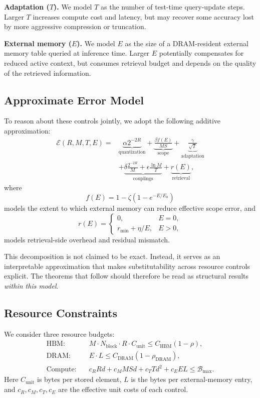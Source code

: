 \documentclass[11pt,a4paper]{article}
\theoremstyle{plain}
\theoremstyle{definition}
\begin{document}
\textbf{Adaptation ($T$).} We model $T$ as the number of test-time query-update steps. Larger $T$ increases compute cost and latency, but may recover some accuracy lost by more aggressive compression or truncation.

\textbf{External memory ($E$).} We model $E$ as the size of a DRAM-resident external memory table queried at inference time. Larger $E$ potentially compensates for reduced active context, but consumes retrieval budget and depends on the quality of the retrieved information.

\subsection{Approximate Error Model}
To reason about these controls jointly, we adopt the following additive approximation:
\begin{equation}
\begin{aligned}
\mathcal{E}(R,M,T,E) = &\underbrace{\alpha 2^{-2R}}_{\text{quantization}} + \underbrace{\frac{\beta f(E)}{MS}}_{\text{scope}} + \underbrace{\frac{\gamma}{\sqrt{T}}}_{\text{adaptation}} \\
&+ \underbrace{\delta\frac{2^{-2R}}{M} + \epsilon\frac{\ln M}{T}}_{\text{couplings}} + \underbrace{r(E)}_{\text{retrieval}},
\end{aligned}
\label{eq:error}
\end{equation}
where
\[
f(E) = 1 - \zeta(1 - e^{-E/E_0})
\]
models the extent to which external memory can reduce effective scope error, and
\[
r(E) = 
\begin{cases}
0, & E=0,\\
r_{\min} + \eta/E, & E>0,
\end{cases}
\]
models retrieval-side overhead and residual mismatch.

This decomposition is not claimed to be exact. Instead, it serves as an interpretable approximation that makes substitutability across resource controls explicit. The theorems that follow should therefore be read as structural results \emph{within this model}.

\subsection{Resource Constraints}
We consider three resource budgets:
\begin{align}
\text{HBM:}\quad & M \cdot N_{\text{block}} \cdot R \cdot C_{\text{unit}} \leq C_{\text{HBM}}(1-\rho), \label{eq:hbm} \\
\text{DRAM:}\quad & E \cdot L \leq C_{\text{DRAM}}(1-\rho_{\text{DRAM}}), \label{eq:dram} \\
\text{Compute:}\quad & c_R R d + c_M M S d + c_T T d^2 + c_E E L \leq \mathcal{B}_{\max}. \label{eq:compute}
\end{align}
Here $C_{\text{unit}}$ is bytes per stored element, $L$ is the bytes per external-memory entry, and $c_R,c_M,c_T,c_E$ are the effective unit costs of each control.
\end{document}
